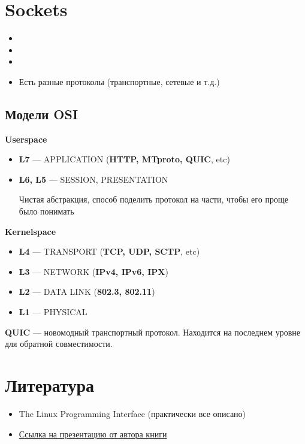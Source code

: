 \documentclass[../../lectures.tex]{subfiles}
\begin{document}
\newpage
\section{Sockets}
\begin{itemize}
    \item {}
    \item {}
    \item {}
    \item Есть разные протоколы (транспортные, сетевые и т.д.)
\end{itemize}

\subsection{Модели \textbf{OSI}}
\begin{center}\textbf{Userspace}\end{center}
\begin{itemize}
    \item \textbf{L7} --- APPLICATION (\textbf{HTTP, MTproto, QUIC}, etc)
    \item \textbf{L6, L5} --- SESSION, PRESENTATION

          Чистая абстракция, способ поделить протокол на части, чтобы его проще было понимать
\end{itemize}

\begin{center}\textbf{Kernelspace}\end{center}
\begin{itemize}
    \item \textbf{L4} --- TRANSPORT (\textbf{TCP, UDP, SCTP}, etc)
    \item \textbf{L3} --- NETWORK (\textbf{IPv4, IPv6, IPX})
    \item \textbf{L2} --- DATA LINK (\textbf{802.3, 802.11})
    \item \textbf{L1} --- PHYSICAL
\end{itemize}

\textbf{QUIC} --- новомодный транспортный протокол. Находится на последнем уровне для обратной совместимости.

\newpage
\section{Литература}
\begin{itemize}
    \item The Linux Programming Interface (практически все описано)
    \item \textcolor{blue}{
        \href{http://man7.org/conf/lca2013/IPC_Overview-LCA-2013-printable.pdf}{Ссылка на презентацию от автора книги}
    }
\end{itemize}
\end{document}
